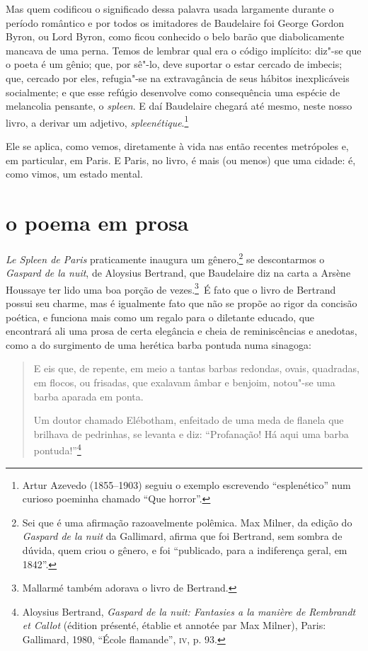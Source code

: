 Mas quem codificou o significado dessa palavra usada largamente durante
o período romântico e por todos os imitadores de Baudelaire foi George
Gordon Byron, ou Lord Byron, como ficou conhecido o belo barão que
diabolicamente mancava de uma perna. Temos de lembrar qual era o código
implícito: diz"-se que o poeta é um gênio; que, por sê"-lo, deve
suportar o estar cercado de imbecis; que, cercado por eles,
refugia"-se na extravagância de seus hábitos inexplicáveis
socialmente; e que esse refúgio desenvolve como consequência uma
espécie de melancolia pensante, o \textit{spleen}. E daí 
Baudelaire chegará até mesmo, neste nosso livro, a derivar um
adjetivo,\textit{ spleenétique}.\footnote{ Artur Azevedo
(1855--1903) seguiu o exemplo escrevendo “esplenético” num curioso
poeminha chamado “Que horror”.}

Ele se aplica, como vemos, diretamente à vida nas então recentes
metrópoles e, em particular, em Paris. E Paris, no livro, é mais (ou
menos) que uma cidade: é, como vimos, um estado mental.

\section*{o poema em prosa}
\textit{Le Spleen de Paris} praticamente inaugura um gênero,\footnote{
Sei que é uma afirmação razoavelmente polêmica. Max Milner, da edição
do \textit{Gaspard de la nuit} da Gallimard, afirma que foi Bertrand, sem sombra
de dúvida, quem criou o gênero, e foi “publicado, para a indiferença
geral, em 1842”.} se descontarmos o \textit{Gaspard de la nuit}, de
Aloysius Bertrand, que Baudelaire diz na carta a Arsène Houssaye ter
lido uma boa porção de vezes.\footnote{ Mallarmé também adorava o livro
de Bertrand.}~É fato que o livro de Bertrand possui seu charme, mas é
igualmente fato que não se propõe ao rigor da concisão poética, e
funciona mais como um regalo para o diletante educado, que encontrará
ali uma prosa de certa elegância e cheia de reminiscências e anedotas,
como a do surgimento de uma herética barba pontuda numa sinagoga:

\begin{quote}
E eis que, de repente, em meio a tantas barbas redondas, ovais,
quadradas, em flocos, ou frisadas, que exalavam âmbar e benjoim,
notou"-se uma barba aparada em ponta.

Um doutor chamado Elébotham, enfeitado de uma meda de flanela que
brilhava de pedrinhas, se levanta e diz: “Profanação! Há aqui uma barba
pontuda!”\footnote{ Aloysius Bertrand, \textit{Gaspard de la nuit: Fantasies a
la manière de Rembrandt et Callot} (édition présenté, établie et annotée
par Max Milner), Paris: Gallimard, 1980, “École flamande”, \textsc{iv}, p. 93.}
\end{quote}

